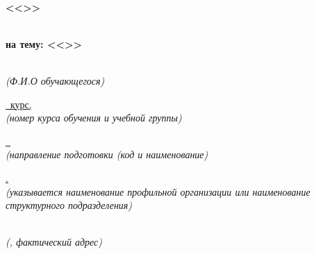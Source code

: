 \thispagestyle{empty}%
\makeatletter
{}
%
\makeatother



{\centering%
	\small%
	\MakeUppercase{\SPbPUOfficialPrefix}\\
	{\bfseries %
	<<\MakeUppercase{\SPbPU}>>\\%
	\uline{\institute}
	}
\par}%
	

\vspace{0pt plus1fill} %


\noindent




{\centering%
	{\bfseries{} 
	\DocType\\
	на тему: <<\practiceTitle>>}\\

\intervalS

\normalfont\uline{\AuthorFull}\\%
\footnotesize{\textit{(Ф.И.О обучающегося)}}

\normalsize\uline{\course~курс, \group}\\%
\footnotesize{\textit{(номер курса обучения и учебной группы)}}

\normalsize\uline{\thesisSpecialtyCode~\thesisSpecialtyTitle}\\%
\footnotesize{\textit{(направление подготовки (код и наименование)}}

\normalsize\uline{ {\expandafter \Workplace}.}\\%
\footnotesize{\textit{(указывается наименование профильной организации или наименование структурного подразделения)}}

\normalsize\uline{\WorkplaceAddress}\\%
\footnotesize{\textit{(\SPbPUOfficialShort, фактический адрес)}}

\intervalS\normalfont%

\par}%

